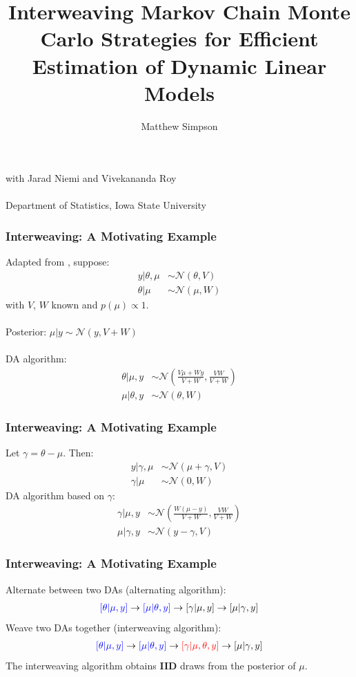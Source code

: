 \documentclass[xcolor=dvipsnames]{beamer}
\title[Interweaving MCMC Strats for DLMs]{Interweaving Markov Chain Monte Carlo Strategies for Efficient
Estimation of Dynamic Linear Models}
\author[M. Simpson]{Matthew Simpson}
\date{}
\institute[Deps of Stat \& Econ, ISU]{Departments of Statistics and Economics, Iowa State University}
\newcommand\N{\mathcal{N}}
\begin{document}
\begin{frame}
\titlepage
\begin{center}
with Jarad Niemi and Vivekananda Roy\\~\\
\scriptsize{Department of Statistics, Iowa State University}
\end{center}
\end{frame}

\begin{frame}
\frametitle{Interweaving: A Motivating Example}
Adapted from \citet{yu2011center}, suppose:
\begin{align*}
y|\theta, \mu & \sim \N(\theta, V) \\
\theta|\mu & \sim \N(\mu, W) 
\end{align*}
with $V$, $W$ known and $p(\mu)\propto 1$.\\~\\
Posterior: $\mu|y \sim \N(y, V+W)$\\~\\
DA algorithm:
\begin{align*}
\theta|\mu,y &\sim \N\left(\frac{V\mu + Wy}{V+W}, \frac{VW}{V+W}\right)\\
\mu |\theta, y &\sim \N(\theta, W)
\end{align*}
\end{frame}

\begin{frame}
\frametitle{Interweaving: A Motivating Example}
Let $\gamma = \theta - \mu$. Then:
\begin{align*}
y|\gamma, \mu & \sim \N(\mu + \gamma, V) \\
\gamma|\mu & \sim \N(0, W) 
\end{align*}
DA algorithm based on $\gamma$:
\begin{align*}
\gamma|\mu,y &\sim \N\left(\frac{W(\mu - y)}{V+W}, \frac{VW}{V+W}\right)\\
\mu |\gamma, y &\sim \N(y-\gamma, V)
\end{align*}
\end{frame}

\begin{frame}
\frametitle{Interweaving: A Motivating Example}
Alternate between two DAs (alternating algorithm):
\begin{align*}
{\color{blue}[\theta|\mu,y]} \to {\color{blue}[\mu|\theta,y]} \to [\gamma|\mu,y] \to [\mu|\gamma,y]
\end{align*}
Weave two DAs together (interweaving algorithm):
\begin{align*}
{\color{blue}[\theta|\mu,y]} \to {\color{blue}[\mu|\theta,y]} \to {\color{red}[\gamma|\mu,\theta,y]} \to [\mu|\gamma,y]
\end{align*}
The interweaving algorithm obtains {\bf IID} draws from the posterior of $\mu$.
\end{frame}
\end{document}

